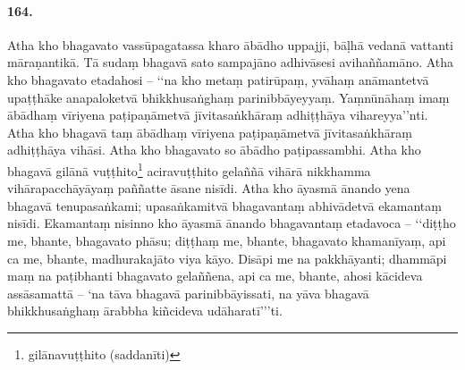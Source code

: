 \paragraph{164.} Atha kho bhagavato vassūpagatassa kharo ābādho uppajji, bāḷhā vedanā vattanti māraṇantikā. Tā sudaṃ bhagavā sato sampajāno adhivāsesi avihaññamāno. Atha kho bhagavato etadahosi – ‘‘na kho metaṃ patirūpaṃ, yvāhaṃ anāmantetvā upaṭṭhāke anapaloketvā bhikkhusaṅghaṃ parinibbāyeyyaṃ. Yaṃnūnāhaṃ imaṃ ābādhaṃ vīriyena paṭipaṇāmetvā jīvitasaṅkhāraṃ adhiṭṭhāya vihareyya’’nti. Atha kho bhagavā taṃ ābādhaṃ vīriyena paṭipaṇāmetvā jīvitasaṅkhāraṃ adhiṭṭhāya vihāsi. Atha kho bhagavato so ābādho paṭipassambhi. Atha kho bhagavā gilānā vuṭṭhito\footnote{gilānavuṭṭhito (saddanīti)} aciravuṭṭhito gelaññā vihārā nikkhamma vihārapacchāyāyaṃ paññatte āsane nisīdi. Atha kho āyasmā ānando yena bhagavā tenupasaṅkami; upasaṅkamitvā bhagavantaṃ abhivādetvā ekamantaṃ nisīdi. Ekamantaṃ nisinno kho āyasmā ānando bhagavantaṃ etadavoca – ‘‘diṭṭho me, bhante, bhagavato phāsu; diṭṭhaṃ me, bhante, bhagavato khamanīyaṃ, api ca me, bhante, madhurakajāto viya kāyo. Disāpi me na pakkhāyanti; dhammāpi maṃ na paṭibhanti bhagavato gelaññena, api ca me, bhante, ahosi kācideva assāsamattā – ‘na tāva bhagavā parinibbāyissati, na yāva bhagavā bhikkhusaṅghaṃ ārabbha kiñcideva udāharatī’’’ti.

